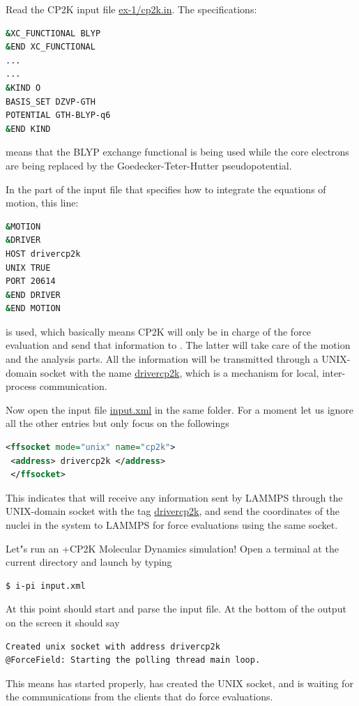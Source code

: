 \documentclass{article}
\begin{document}
\begin{Exercise}[label={i-pi},title={Molecular Dynamics: a client/server approach}]
\Question
Read the CP2K input file \url{ex-1/cp2k.in}. The specifications:
\begin{lstlisting}[language=bash]
&XC_FUNCTIONAL BLYP
&END XC_FUNCTIONAL
...
...
&KIND O
BASIS_SET DZVP-GTH
POTENTIAL GTH-BLYP-q6
&END KIND

\end{lstlisting}
means that the BLYP exchange functional is being used while the core electrons are being replaced by the Goedecker-Teter-Hutter pseudopotential. 

In the part of the input file that specifies how to integrate the
equations of motion, this line:
\begin{lstlisting}[language=bash]
&MOTION
&DRIVER
HOST drivercp2k
UNIX TRUE
PORT 20614
&END DRIVER
&END MOTION
\end{lstlisting}
is used, which basically means CP2K will only be in charge of the 
force evaluation and send that information to \ipi{}.
The latter will take care of the motion and the analysis parts.
All the information will be transmitted through a UNIX-domain socket with the name \url{drivercp2k}, which is a mechanism for local, inter-process communication.

\Question
Now open the \ipi{} input file \url{input.xml} in the same folder.
For a moment let us ignore all the other entries but only focus on the followings
\begin{lstlisting}[language=xml]
 <ffsocket mode="unix" name="cp2k">
 <address> drivercp2k </address>
 </ffsocket>
\end{lstlisting}
This indicates that \ipi{} will receive any information sent by LAMMPS through the UNIX-domain socket with the tag \url{drivercp2k},
and send the coordinates of the nuclei in the system to LAMMPS for force evaluations using the same socket.

\Question
Let"s run an \ipi{}+CP2K Molecular Dynamics simulation!
Open a terminal at the current directory and
launch \ipi{} by typing
\begin{lstlisting}[language=bash]
$ i-pi input.xml 
\end{lstlisting}
At this point \ipi{} should start 
and parse the input file. At the bottom of the output on the screen it should say
\begin{lstlisting}[language=bash]
Created unix socket with address drivercp2k
@ForceField: Starting the polling thread main loop.
\end{lstlisting}
This means \ipi{} has started properly, has created the UNIX socket, and is waiting for the communications from the clients that do force evaluations.


\end{Exercise}
\end{document}
